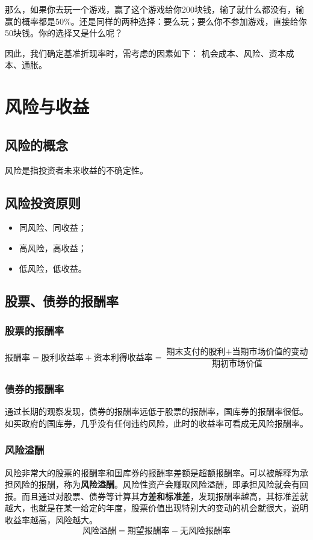 \documentclass[12pt, a4paper, oneside]{ctexbook}
\begin{document}
那么，如果你去玩一个游戏，赢了这个游戏给你200块钱，输了就什么都没有，输赢的概率都是50\%。还是同样的两种选择：要么玩；要么你不参加游戏，直接给你50块钱。你的选择又是什么呢？

因此，我们确定基准折现率时，需考虑的因素如下：
机会成本、风险、资本成本、通胀。

\section{风险与收益}
\subsection{风险的概念}
风险是指投资者未来收益的不确定性。
\subsection{风险投资原则}
\begin{itemize}
    \item 同风险、同收益；
    \item 高风险，高收益；
    \item 低风险，低收益。
\end{itemize}

\subsection{股票、债券的报酬率}
\subsubsection{股票的报酬率}
$$\mbox{报酬率}=\mbox{股利收益率}+\mbox{资本利得收益率}=\frac{\mbox{期末支付的股利}+\mbox{当期市场价值的变动}}{\mbox{期初市场价值}}$$

\subsubsection{债券的报酬率}
通过长期的观察发现，债券的报酬率远低于股票的报酬率，国库券的报酬率很低。如买政府的国库券，几乎没有任何违约风险，此时的收益率可看成无风险报酬率。

\subsubsection{风险溢酬}
风险非常大的股票的报酬率和国库券的报酬率差额是超额报酬率。可以被解释为承担风险的报酬，称为\textbf{风险溢酬}。风险性资产会赚取风险溢酬，即承担风险就会有回报。而且通过对股票、债券等计算其\textbf{方差和标准差}，发现报酬率越高，其标准差就越大，也就是在某一给定的年度，股票价值出现特别大的变动的机会就很大，说明收益率越高，风险越大。
$$\mbox{风险溢酬}=\mbox{期望报酬率}-\mbox{无风险报酬率}$$
\end{document}
